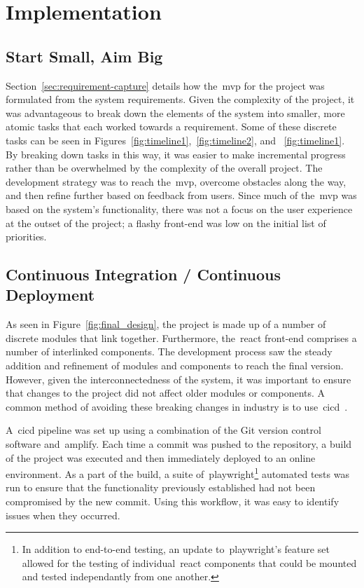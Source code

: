 \thispagestyle{plain}
\newpage
\section{Implementation}\label{sec:implementation}

\normalsize

\subsection{Start Small, Aim Big}\label{subsec:start-small-aim-big}

Section~\ref{sec:requirement-capture} details how the~\gls{mvp} for the project was formulated from the system requirements.
Given the complexity of the project,
it was advantageous to break down the elements of the system into smaller,
more atomic tasks that each worked towards a requirement.
Some of these discrete tasks can be seen in Figures~\ref{fig:timeline1},~\ref{fig:timeline2}, and ~\ref{fig:timeline1}.
By breaking down tasks in this way,
it was
easier to make incremental progress
rather than be overwhelmed by the complexity of the overall project.
The development strategy was to reach the~\gls{mvp}, overcome obstacles along the way,
and then refine further based on feedback from users.
Since much of the~\gls{mvp} was based on the system's functionality,
there was not a focus on the user experience at the outset of the project;
a flashy front-end was low on the initial list of priorities.

\subsection{Continuous Integration / Continuous Deployment}\label{subsec:continuous-integration-continuous-deployment}

As seen in Figure~\ref{fig:final_design}, the project is made up of a number of discrete modules that link together.
Furthermore, the~\gls{react} front-end comprises a number of interlinked components.
The development process saw the steady addition and refinement of modules and components to reach the final version.
However, given the interconnectedness of the system,
it was important to ensure that changes to the project did not affect older modules or components.
A common method of avoiding these breaking changes in industry is
to use~\gls{cicd}~\citep{duvall2007continuous, miller-ci}.

A~\gls{cicd} pipeline was set up using a combination of the Git version control software and~\gls{amplify}.
Each time a commit was pushed to the repository,
a build of the project was executed and then immediately deployed to an online environment.
As a part of the build,
a suite of~\gls{playwright}\footnote{In addition to end-to-end testing, an update to~\gls{playwright}'s feature set allowed for the testing of individual~\gls{react} components that could be mounted and tested independantly from one another.} automated tests was run
to ensure that the functionality previously established had not been compromised by the new commit.
Using this workflow, it was easy to identify issues when they occurred.

